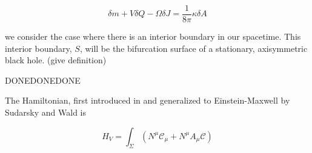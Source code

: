 \documentclass[titlepage]{article}
\def\beq{\begin{equation}}
\def\eeq{\end{equation}}
\begin{document}
\beq
\delta m + V \delta Q -\Omega \delta J= \frac{1}{8\pi} \kappa \delta A
\eeq



we consider the case where there is an interior boundary in our spacetime.  This interior boundary, $S$, will be the bifurcation surface of a stationary, axisymmetric black hole. (give definition) 



DONEDONEDONE


\newpage

The Hamiltonian, first introduced in \cite{regge1974improved} and generalized to Einstein-Maxwell by Sudarsky and Wald \cite{sudarskyExtrema92} is 

\beq
H_V=\int_\Sigma\left(N^\mu\mathcal{C}_\mu+N^\mu A_\mu \mathcal{C} \right)
\eeq







\nocite{*}
\newpage
{}

\end{document}

